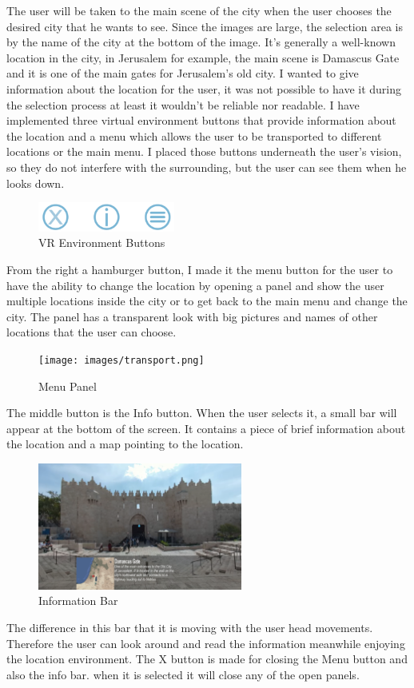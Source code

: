 The user will be taken to the main scene of the city when the user chooses the desired city that he wants to see. Since the images are large, the selection area is by the name of the city at the bottom of the image. It's generally a well-known location in the city, in Jerusalem for example, the main scene is Damascus Gate and it is one of the main gates for Jerusalem's old city. I wanted to give information about the location for the user, it was not possible to have it during the selection process at least it wouldn't be reliable nor readable. I have implemented three virtual environment buttons that provide information about the location and a menu which allows the user to be transported to different locations or the main menu. I placed those buttons underneath the user's vision, so they do not interfere with the surrounding, but the user can see them when he looks down.  

\begin{figure}[ht]
    \centering
    \includegraphics[width=0.40\textwidth]{images/menu.png}
    \caption{VR Environment Buttons}
    \label{fig:a}
\end{figure} 

From the right a hamburger button, I made it the menu button for the user to have the ability to change the location by opening a panel and show the user multiple locations inside the city or to get back to the main menu and change the city. The panel has a transparent look with big pictures and names of other locations that the user can choose.
\begin{figure}[ht]
    \centering
    \texttt{[image: images/transport.png]}
    \caption{Menu Panel}
    \label{fig:mp}
\end{figure} 
The middle button is the Info button. When the user selects it, a small bar will appear at the bottom of the screen. It contains a piece of brief information about the location and a map pointing to the location.
\begin{figure}[ht]
    \centering
    \includegraphics[width=0.60\textwidth]{images/Info.png}
    \caption{Information Bar}
    \label{fig:ib}
\end{figure} 
The difference in this bar that it is moving with the user head movements. Therefore the user can look around and read the information meanwhile enjoying the location environment. 
The X button is made for closing the Menu button and also the info bar. when it is selected it will close any of the open panels. 



